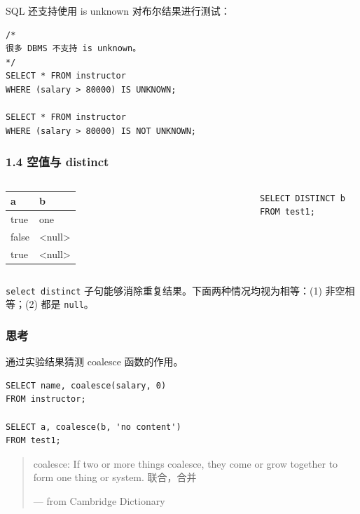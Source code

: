 \documentclass[aspectratio=169, 14pt]{beamer}
\begin{document}
\begin{frame}[fragile]
SQL 还支持使用 \alert{is unknown} 对布尔结果进行测试：

\begin{verbatim}
/*
很多 DBMS 不支持 is unknown。
*/
SELECT * FROM instructor
WHERE (salary > 80000) IS UNKNOWN;

SELECT * FROM instructor
WHERE (salary > 80000) IS NOT UNKNOWN;
\end{verbatim} 
    
\end{frame}

\begin{frame}[fragile]
    \frametitle{1.4 空值与 distinct}
    \begin{columns}
        \begin{table}
            \begin{tabular}{ll}
              \toprule
              a & b \\
              \midrule
              true & one \\
              false & <null> \\
              true & <null> \\
              \bottomrule
            \end{tabular}
        \end{table}
        \begin{verbatim}
SELECT DISTINCT b FROM test1;
        \end{verbatim} 
    \end{columns}

\pause
\texttt{select distinct} 子句能够消除重复结果。下面两种情况均视为相等：(1) 非空相等；(2) 都是 \texttt{null}。

\end{frame}

\begin{frame}[fragile]
    \frametitle{思考}

通过实验结果猜测 \alert{coalesce} 函数的作用。

\begin{verbatim}
SELECT name, coalesce(salary, 0)
FROM instructor;

SELECT a, coalesce(b, 'no content')
FROM test1;
\end{verbatim} 
    
\begin{quote}
    coalesce: If two or more things coalesce, they come or grow together to form one thing or system. 联合，合并 
    \begin{flushright}
        --- from Cambridge Dictionary
    \end{flushright}
\end{quote}

\end{frame}
\end{document}

